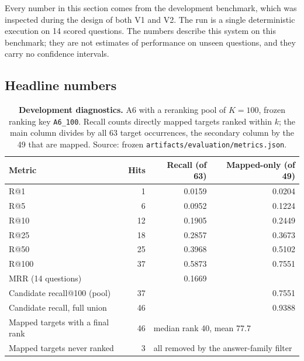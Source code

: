 \documentclass[11pt,a4paper]{article}
\theoremstyle{remark}
\newcommand{\code}[1]{\texttt{\small #1}}
\begin{document}
\begin{cautionbox}
Every number in this section comes from the development benchmark, which was inspected
during the design of both V1 and V2. The run is a single deterministic execution on 14
scored questions. The numbers describe this system on this benchmark; they are not
estimates of performance on unseen questions, and they carry no confidence intervals.
\end{cautionbox}

\subsection{Headline numbers}

\begin{table}[!htbp]
\centering
\caption[A6 results (development diagnostics)]{\textbf{Development diagnostics.} A6 with a reranking pool of $K=100$, frozen
ranking key \code{A6\_100}. Recall counts directly mapped targets ranked within $k$; the
main column divides by all 63 target occurrences, the secondary column by the 49 that are
mapped. Source: frozen \code{artifacts/evaluation/metrics.json}.}
\label{tab:results}
\begin{tabular}{lrrr}
\toprule
Metric & Hits & Recall (of 63) & Mapped-only (of 49)\\
\midrule
R@1 & 1 & 0.0159 & 0.0204\\
R@5 & 6 & 0.0952 & 0.1224\\
R@10 & 12 & 0.1905 & 0.2449\\
R@25 & 18 & 0.2857 & 0.3673\\
R@50 & 25 & 0.3968 & 0.5102\\
R@100 & 37 & 0.5873 & 0.7551\\
\midrule
MRR (14 questions) & & 0.1669 & \\
\midrule
Candidate recall@100 (pool) & 37 & & 0.7551\\
Candidate recall, full union & 46 & & 0.9388\\
Mapped targets with a final rank & 46 & \multicolumn{2}{l}{median rank 40, mean 77.7}\\
Mapped targets never ranked & 3 & \multicolumn{2}{l}{all removed by the answer-family filter}\\
\bottomrule
\end{tabular}
\end{table}
\end{document}
